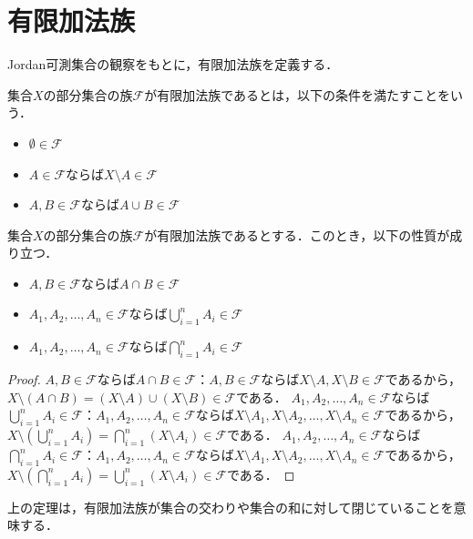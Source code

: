 \section{有限加法族}
Jordan可測集合の観察をもとに，有限加法族を定義する．
\begin{definition}[有限加法族]
    集合$X$の部分集合の族$\mathcal{F}$が有限加法族であるとは，以下の条件を満たすことをいう．
    \begin{itemize}
        \item $\emptyset \in \mathcal{F}$
        \item $A \in \mathcal{F}$ならば$X \setminus A \in \mathcal{F}$
        \item $A, B \in \mathcal{F}$ならば$A \cup B \in \mathcal{F}$
    \end{itemize}
\end{definition}
\begin{theorem}[有限加法族の性質]
    集合$X$の部分集合の族$\mathcal{F}$が有限加法族であるとする．このとき，以下の性質が成り立つ．
    \begin{itemize}
        \item $A, B \in \mathcal{F}$ならば$A \cap B \in \mathcal{F}$
        \item $A_1, A_2, \ldots, A_n \in \mathcal{F}$ならば$\bigcup_{i=1}^n A_i \in \mathcal{F}$
        \item $A_1, A_2, \ldots, A_n \in \mathcal{F}$ならば$\bigcap_{i=1}^n A_i \in \mathcal{F}$
    \end{itemize}
\end{theorem}
\begin{proof}
    $A, B \in \mathcal{F}$ならば$A \cap B \in \mathcal{F}$：$A, B \in \mathcal{F}$ならば$X \setminus A, X \setminus B \in \mathcal{F}$であるから，$X \setminus (A \cap B) = (X \setminus A) \cup (X \setminus B) \in \mathcal{F}$である．
    $A_1, A_2, \ldots, A_n \in \mathcal{F}$ならば$\bigcup_{i=1}^n A_i \in \mathcal{F}$：$A_1, A_2, \ldots, A_n \in \mathcal{F}$ならば$X \setminus A_1, X \setminus A_2, \ldots, X \setminus A_n \in \mathcal{F}$であるから，$X \setminus \left( \bigcup_{i=1}^n A_i \right) = \bigcap_{i=1}^n (X \setminus A_i) \in \mathcal{F}$である．
    $A_1, A_2, \ldots, A_n \in \mathcal{F}$ならば$\bigcap_{i=1}^n A_i \in \mathcal{F}$：$A_1, A_2, \ldots, A_n \in \mathcal{F}$ならば$X \setminus A_1, X \setminus A_2, \ldots, X \setminus A_n \in \mathcal{F}$であるから，$X \setminus \left( \bigcap_{i=1}^n A_i \right) = \bigcup_{i=1}^n (X \setminus A_i) \in \mathcal{F}$である．
\end{proof}
\begin{remark}
    上の定理は，有限加法族が集合の交わりや集合の和に対して閉じていることを意味する．
\end{remark}
